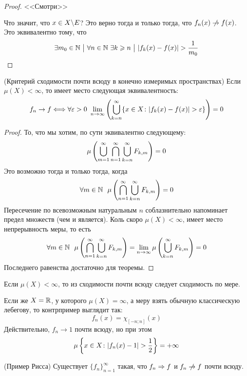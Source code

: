\begin{proof}
	<<Смотри>>
	
	Что значит, что $x \in X \backslash E$? Это верно тогда и только тогда, что $f_n(x) \centernot\to f(x)$. Это эквивалентно тому, что
	\[
		\exists m_0 \in \N \such \forall n \in \N\ \exists k \ge n \such |f_k(x) - f(x)| > \frac{1}{m_0}
	\]
\end{proof}

\begin{theorem} (Критерий сходимости почти всюду в конечно измеримых пространствах)
	Если $\mu(X) < \infty$, то имеет место следующая эквивалентность:
	\[
		f_n \to f \Longleftrightarrow \forall \eps >0\ \lim_{n \to \infty} \ps{\bigcup_{k = n}^\infty \{x \in X \colon |f_k(x) - f(x)| > \eps\}} = 0
	\]
\end{theorem}

\begin{proof}
	То, что мы хотим, по сути эквивалентно следующему:
	\[
		\mu\left(\bigcup_{m = 1}^\infty \bigcap_{n = 1}^\infty \bigcup_{k = n}^\infty F_{k, m}\right) = 0
	\]
	Это возможно тогда и только тогда, когда
	\[
		\forall m \in \mathbb{N}\ \ \mu\left(\bigcap_{n = 1}^\infty \bigcup_{k = n}^\infty F_{k, m}\right) = 0
	\]
	Пересечение по всевозможным натуральным $n$ соблазнительно напоминает предел множеств (чем и является). Коль скоро $\mu(X) < \infty$, имеет место непрерывность меры, то есть
	\[
		\forall m \in \mathbb{N}\ \ \mu\left(\bigcap_{n = 1}^\infty \bigcup_{k = n}^\infty F_{k, m}\right) = \lim_{n \to \infty} \mu\left(\bigcup_{k = n}^\infty F_{k, m}\right) = 0
	\]
	Последнего равенства достаточно для теоремы.
\end{proof}

\begin{corollary}
	Если $\mu(X) < \infty$, то из сходимости почти всюду следует сходимость по мере.
\end{corollary}

\begin{note}
	Если же $X = \mathbb{R}$, у которого $\mu(X) = \infty$, а меру взять обычную классическую лебегову, то контрпример выглядит так:
	\[
		f_n(x) = \chi_{[-n; n]}(x)
	\]
	Действительно, $f_n \to 1$ почти всюду, но при этом
	\[
		\mu\left\{x \in X \colon |f_n(x) - 1| > \frac{1}{2}\right\} = +\infty
	\]
\end{note}

\begin{theorem} (Пример Рисса)
	Существует $\{f_n\}_{n = 1}^\infty$ такая, что $f_n \Rightarrow f$ и $f_n \centernot\to f$ почти всюду.
\end{theorem}


